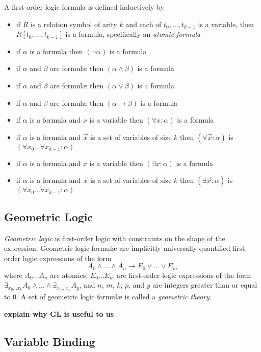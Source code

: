 		A first-order logic formula is defined inductively by
		\begin{itemize}
		\item if $R$ is a relation symbol of arity $k$ and each of $t_0 , \ldots , t_{k-1}$ is a variable, then $R[t_0,\ldots,t_{k-1}]$ is a formula, specifically an \emph{atomic formula}
		\item if $\alpha$ is a formula then $(\neg\alpha)$ is a formula
		\item if $\alpha$ and $\beta$ are formul{\ae} then $(\alpha\wedge\beta)$ is a formula
		\item if $\alpha$ and $\beta$ are formul{\ae} then $(\alpha\vee\beta)$ is a formula
		\item if $\alpha$ and $\beta$ are formul{\ae} then $(\alpha\to\beta)$ is a formula
		\item if $\alpha$ is a formula and $x$ is a variable then $(\forall x : \alpha)$ is a formula
		\item if $\alpha$ is a formula and $\vec{x}$ is a set of variables of size $k$ then $(\forall \vec{x} : \alpha)$ is $(\forall x_0 \ldots \forall x_{k-1} : \alpha)$
		\item if $\alpha$ is a formula and $x$ is a variable then $(\exists x : \alpha)$ is a formula
		\item if $\alpha$ is a formula and $\vec{x}$ is a set of variables of size $k$ then $(\exists \vec{x} : \alpha)$ is $(\forall x_0 \ldots \forall x_{k-1} : \alpha)$
		\end{itemize}

	\subsection{Geometric Logic}

		\emph{Geometric logic} is first-order logic with constraints on the
		shape of the expression.  Geometric logic formul{\ae} are implicitly
		universally quantified first-order logic expressions of the form \[A_0
		\wedge \ldots \wedge A_n \to E_0 \vee \ldots \vee E_m\] where $A_0
		\ldots A_n$ are atomics, $E_0 \ldots E_m$ are first-order logic
		expressions of the form $\exists_{x_0 \ldots x_k} A_0 \wedge \ldots
		\wedge \exists_{x_0 \ldots x_p} A_y$, and $n$, $m$, $k$, $p$, and $y$
		are integers greater than or equal to $0$. A set of geometric logic
		formul{\ae} is called a \emph{geometric theory}.

		\textbf{explain why GL is useful to us}

	\subsection{Variable Binding}

